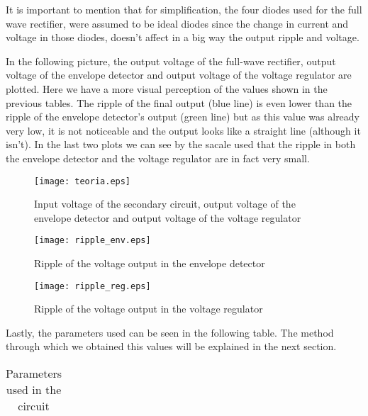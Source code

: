 \par It is important to mention that for simplification, the four diodes used for the full wave rectifier, were assumed to be ideal diodes since the change in current and voltage in those diodes, doesn't affect in a big way the output ripple and voltage. 

\par In the following picture, the output voltage of the full-wave rectifier, output voltage of the envelope detector and output voltage of the voltage regulator are plotted. Here we have a more visual perception of the values shown in the previous tables. The ripple of the final output (blue line) is even lower than the ripple of the envelope detector's output (green line) but as this value was already very low, it is not noticeable and the output looks like a straight line (although it isn't). In the last two plots we can see by the sacale used that the ripple in both the envelope detector and the voltage regulator are in fact very small.

\begin{figure}[h!] \centering
\texttt{[image: teoria.eps]}
\caption{Input voltage of the secondary circuit, output voltage of the envelope detector and output voltage of the voltage regulator}
\end{figure}

\begin{figure}[h!] \centering
\texttt{[image: ripple\_env.eps]}
\caption{Ripple of the voltage output in the envelope detector}
\end{figure}

\begin{figure}[h!] \centering
\texttt{[image: ripple\_reg.eps]}
\caption{Ripple of the voltage output in the voltage regulator}
\end{figure}


\par Lastly, the parameters used can be seen in the following table. The method through which we obtained this values will be explained in the next section.

\vspace{5mm}
\begin{table}[h!]
\centering
\begin{tabularx}{0.9\textwidth} {
  | >{\raggedright\arraybackslash}X
  | >{\raggedleft\arraybackslash}X | }
 \hline

\end{tabularx}
\caption{\label{tab:Table 3} Parameters used in the circuit}
\end{table}
\vspace{5mm}
	


